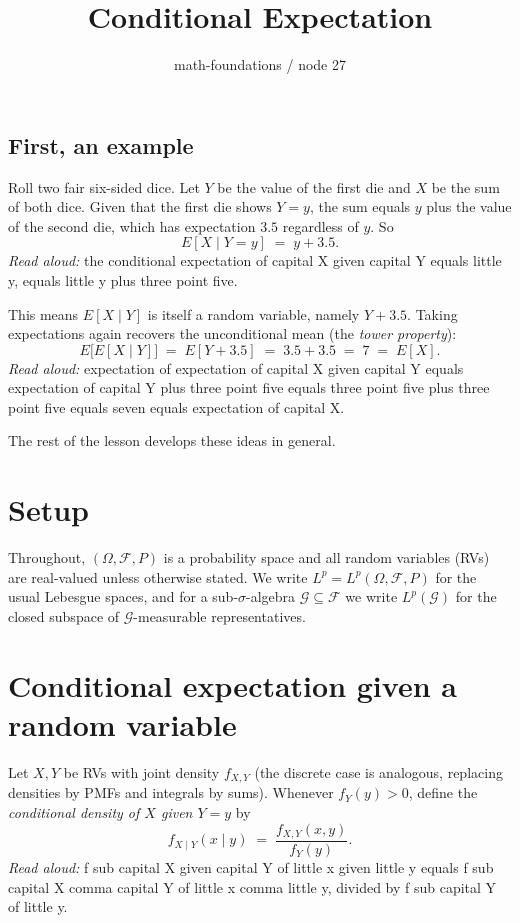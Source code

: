 \documentclass[11pt]{article}
\title{Conditional Expectation}
\author{math-foundations / node 27}
\date{}
\theoremstyle{definition}
\begin{document}
\maketitle

\subsection*{First, an example}

Roll two fair six-sided dice. Let $Y$ be the value of the first die and $X$ be the sum of both dice. Given that the first die shows $Y = y$, the sum equals $y$ plus the value of the second die, which has expectation $3.5$ regardless of $y$. So
\[
E[X \mid Y = y] \;=\; y + 3.5.
\]
\emph{Read aloud:} the conditional expectation of capital X given capital Y equals little y, equals little y plus three point five.

This means $E[X \mid Y]$ is itself a random variable, namely $Y + 3.5$. Taking expectations again recovers the unconditional mean (the \emph{tower property}):
\[
E\bigl[E[X \mid Y]\bigr] \;=\; E[Y + 3.5] \;=\; 3.5 + 3.5 \;=\; 7 \;=\; E[X].
\]
\emph{Read aloud:} expectation of expectation of capital X given capital Y equals expectation of capital Y plus three point five equals three point five plus three point five equals seven equals expectation of capital X.

The rest of the lesson develops these ideas in general.

\section{Setup}

Throughout, $(\Omega, \mathcal{F}, P)$ is a probability space and all random variables (RVs) are real-valued unless otherwise stated. We write $L^p = L^p(\Omega, \mathcal{F}, P)$ for the usual Lebesgue spaces, and for a sub-$\sigma$-algebra $\mathcal{G} \subseteq \mathcal{F}$ we write $L^p(\mathcal{G})$ for the closed subspace of $\mathcal{G}$-measurable representatives.

\section{Conditional expectation given a random variable}

Let $X, Y$ be RVs with joint density $f_{X,Y}$ (the discrete case is analogous, replacing densities by PMFs and integrals by sums). Whenever $f_Y(y) > 0$, define the \emph{conditional density of $X$ given $Y = y$} by
\[
f_{X \mid Y}(x \mid y) \;=\; \frac{f_{X,Y}(x, y)}{f_Y(y)}.
\]
\emph{Read aloud:} f sub capital X given capital Y of little x given little y equals f sub capital X comma capital Y of little x comma little y, divided by f sub capital Y of little y.
\end{document}
